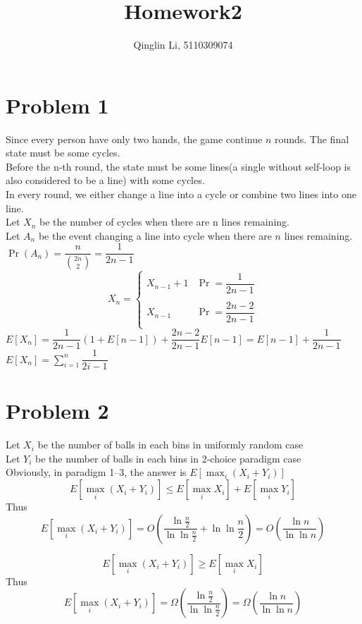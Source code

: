 \documentclass[12pt]{article}
\date{}
\title{Homework2}
\author{Qinglin Li, 5110309074}
\begin{document}
\maketitle
\section*{Problem 1}
Since every person have only two hands, the game continue $n$ rounds. The final state must be some cycles.\\
Before the n-th round, the state must be some lines(a single without self-loop is also considered to be a line) with some cycles.\\
In every round, we either change a line into a cycle or combine two lines into one line.\\
Let $X_n$ be the number of cycles when there are n lines remaining.\\
Let $A_n$ be the event changing a line into cycle when there are $n$ lines remaining.\\
$\Pr(A_n)=\dfrac{n}{\binom{2n}{2}}=\dfrac{1}{2n-1}$
    \begin{equation}
    X_n=\left\{
    \begin{array}{rl}
    X_{n-1}+1&\Pr=\dfrac{1}{2n-1}\\
    \\
    X_{n-1}&\Pr=\dfrac{2n-2}{2n-1}\\
    \end{array}
    \right.
    \end{equation} 
$E[X_n]=\dfrac{1}{2n-1}\left(1+E[n-1]\right)+\dfrac{2n-2}{2n-1}E[n-1]=E[n-1]+\dfrac{1}{2n-1}$\\
$E[X_n]=\displaystyle\sum_{i=1}^{n} \dfrac{1}{2i-1}$

\section*{Problem 2}
Let $X_i$ be the number of balls in each bins in uniformly random case\\
Let $Y_i$ be the number of balls in each bins in 2-choice paradigm case\\
Obviously, in paradigm 1--3, the answer is $E[\max_i(X_i+Y_i)]$\\
\newpage
$$E[\max_i(X_i+Y_i)]\leq E[\max_iX_i]+E[\max_iY_i]$$
Thus 
$$E[\max_i(X_i+Y_i)]=O\left(\dfrac{\ln\frac{n}{2}}{\ln\ln\frac{n}{2}}+\ln\ln\frac{n}{2}\right)=O\left(\dfrac{\ln n}{\ln\ln n}\right)$$

$$E[\max_i(X_i+Y_i)]\geq E[\max_iX_i]$$
Thus
$$E[\max_i(X_i+Y_i)]=\Omega\left(\dfrac{\ln\frac{n}{2}}{\ln\ln\frac{n}{2}}\right)=\Omega\left(\dfrac{\ln n}{\ln\ln n}\right)$$
\end{document}
